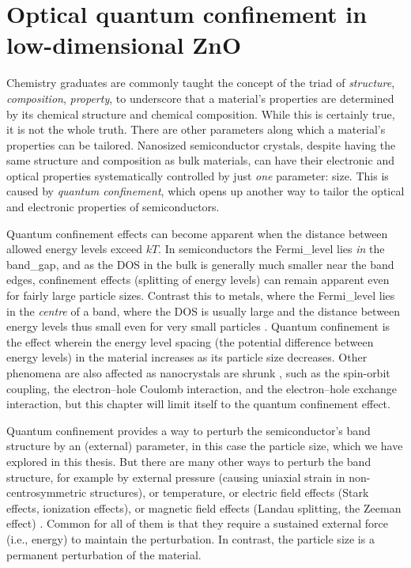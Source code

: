 \documentclass[webedition,openright,titles,swedish,english]{LuaUUThesis}\usepackage[]{graphicx}\usepackage[]{xcolor}
\newcommand{\ie}{i.e.}
\begin{document}
%

\chapter{Optical quantum confinement in low-dimensional ZnO}
\label{ch:quantum-confinement}

Chemistry graduates are commonly taught the concept of the triad of
\emph{structure}, \emph{composition}, \emph{property},
to underscore that a material's properties are determined by its
chemical structure and chemical composition.
While this is certainly true, it is not the whole truth.
There are other parameters along which a material's properties can
be tailored.
Nanosized semiconductor crystals, despite having the same structure and composition
as bulk materials, can have their electronic and optical properties
systematically controlled by just \emph{one} parameter: size.
This is caused by \emph{quantum confinement}, which opens up another way to tailor
the optical and electronic properties of semiconductors.

Quantum confinement effects can become apparent when the distance between allowed
energy levels exceed $kT$.
In semiconductors the \gls{Fermi_level} lies \emph{in} the \gls{band_gap},
and as the \gls{DOS} in the bulk is generally much smaller near the band edges,
confinement effects (splitting of energy levels) can remain apparent even for fairly
large particle sizes.
Contrast this to metals, where the \gls{Fermi_level} lies in the \emph{centre} of a band,
where the \gls{DOS} is usually large and the distance between energy levels
thus small even for very small particles \cite{Delerue2004}.
%
Quantum confinement is the effect wherein the energy level spacing (the potential difference
between energy levels) in the material increases as its particle size decreases.
Other phenomena are also affected as nanocrystals are shrunk \cite[p.\ 114]{Delerue2004},
such as
the spin-orbit coupling,
the electron--hole Coulomb interaction, and
the electron--hole exchange interaction,
but this chapter will limit itself to the quantum confinement effect.

Quantum confinement provides a way to perturb the semiconductor's band structure
by an (external) parameter, in this case the particle size,
which we have explored in this thesis.
But there are many other ways to perturb the band structure, for example by
external pressure (causing uniaxial strain in non-centrosymmetric structures),
or temperature, or electric field effects (Stark effects, ionization effects),
or magnetic field effects (Landau splitting, the Zeeman effect) \cite{Pankove1975}.
Common for all of them is that they require a sustained external force
(\ie, energy) to maintain the perturbation.
In contrast, the particle size is a permanent perturbation
of the material.
\end{document}
